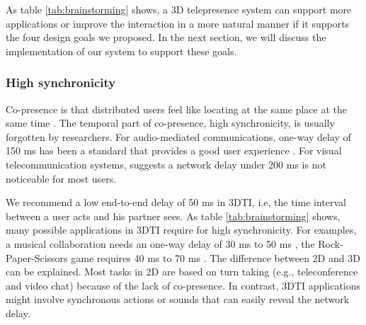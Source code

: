 As table \ref{tab:brainstorming} shows, a 3D telepresence system can support more applications or improve the interaction in a more natural manner if it supports the four design goals we proposed. In the next section, we will discuss the implementation of our system to support these goals.


















\iffalse

\subsubsection{High synchronicity}

Co-presence is that distributed users feel like locating at the same place at the same time \cite{kraut2003visual}. The temporal part of co-presence, high synchronicity, is usually forgotten by researchers. For audio-mediated communications, one-way delay of 150 ms has been a standard that provides a good user experience \cite{recommendation2003114}. For visual telecommunication systems, \cite{tam2012video} suggests a network delay under 200 ms is not noticeable for most users.

We recommend a low end-to-end delay of 50 ms in 3DTI, i.e, the time interval between a user acts and his partner sees. As table \ref{tab:brainstorming} shows, many possible applications in 3DTI require for high synchronicity. For examples, a musical collaboration needs an one-way delay of 30 ms to 50 ms \cite{schuett2002effects}, the Rock-Paper-Scissors game requires 40 ms to 70 ms \cite{hashimoto2006influences}. The difference between 2D and 3D can be explained. Most tasks in 2D are based on turn taking (e.g., teleconference and video chat) because of the lack of co-presence. In contrast, 3DTI applications might involve synchronous actions or sounds that can easily reveal the network delay.

